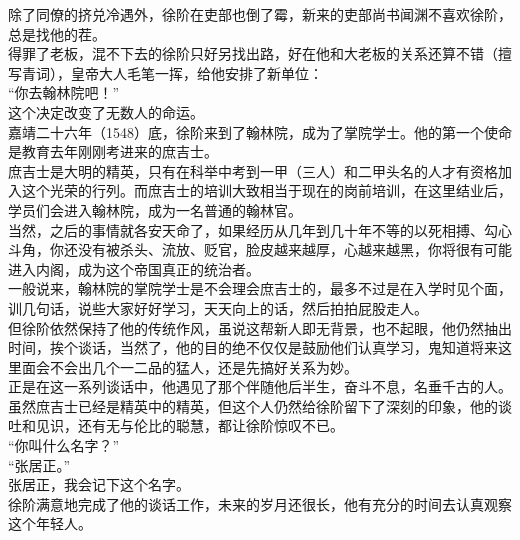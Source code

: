 \begin{multicols}{\theparacolNo}
除了同僚的挤兑冷遇外，徐阶在吏部也倒了霉，新来的吏部尚书闻渊不喜欢徐阶，总是找他的茬。\\

得罪了老板，混不下去的徐阶只好另找出路，好在他和大老板的关系还算不错（擅写青词），皇帝大人毛笔一挥，给他安排了新单位：\\

“你去翰林院吧！”\\

这个决定改变了无数人的命运。\\

嘉靖二十六年（1548）底，徐阶来到了翰林院，成为了掌院学士。他的第一个使命是教育去年刚刚考进来的庶吉士。\\

庶吉士是大明的精英，只有在科举中考到一甲（三人）和二甲头名的人才有资格加入这个光荣的行列。而庶吉士的培训大致相当于现在的岗前培训，在这里结业后，学员们会进入翰林院，成为一名普通的翰林官。\\

当然，之后的事情就各安天命了，如果经历从几年到几十年不等的以死相搏、勾心斗角，你还没有被杀头、流放、贬官，脸皮越来越厚，心越来越黑，你将很有可能进入内阁，成为这个帝国真正的统治者。\\

一般说来，翰林院的掌院学士是不会理会庶吉士的，最多不过是在入学时见个面，训几句话，说些大家好好学习，天天向上的话，然后拍拍屁股走人。\\

但徐阶依然保持了他的传统作风，虽说这帮新人即无背景，也不起眼，他仍然抽出时间，挨个谈话，当然了，他的目的绝不仅仅是鼓励他们认真学习，鬼知道将来这里面会不会出几个一二品的猛人，还是先搞好关系为妙。\\

正是在这一系列谈话中，他遇见了那个伴随他后半生，奋斗不息，名垂千古的人。\\

虽然庶吉士已经是精英中的精英，但这个人仍然给徐阶留下了深刻的印象，他的谈吐和见识，还有无与伦比的聪慧，都让徐阶惊叹不已。\\

“你叫什么名字？”\\

“张居正。”\\

张居正，我会记下这个名字。\\

徐阶满意地完成了他的谈话工作，未来的岁月还很长，他有充分的时间去认真观察这个年轻人。\\


\end{multicols}
